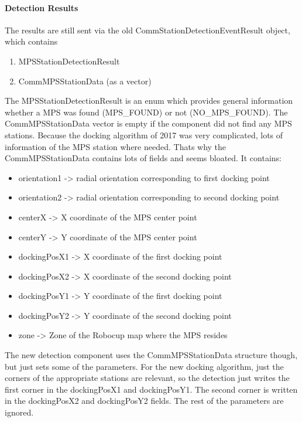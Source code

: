\paragraph{Detection Results}
The results are still sent via the old CommStationDetectionEventResult object, which contains 

\begin{enumerate}
\item MPSStationDetectionResult
\item CommMPSStationData (as a vector)
\end{enumerate}

The MPSStationDetectionResult is an enum which provides general information whether a MPS was found (MPS\_FOUND) or not (NO\_MPS\_FOUND).
The CommMPSStationData vector is empty if the component did not find any MPS stations. Because the docking algorithm of 2017 was very complicated, lots of information of the MPS station where needed. Thats why the CommMPSStationData contains lots of fields and seems bloated. It contains:

\begin{itemize}
\item orientation1 -> radial orientation corresponding to first docking point
\item orientation2 -> radial orientation corresponding to second docking point
\item centerX -> X coordinate of the MPS center point
\item centerY -> Y coordinate of the MPS center point
\item dockingPosX1 -> X coordinate of the first docking point
\item dockingPosX2 -> X coordinate of the second docking point
\item dockingPosY1 -> Y coordinate of the first docking point
\item dockingPosY2 -> Y coordinate of the second docking point
\item zone -> Zone of the Robocup map where the MPS resides
\end{itemize}

The new detection component uses the CommMPSStationData structure though, but just sets some of the parameters. For the new docking algorithm, just the corners of the appropriate stations are relevant, so the detection just writes the first corner in the dockingPosX1 and dockingPosY1. The second corner is written in the dockingPosX2 and dockingPosY2 fields. The rest of the parameters are ignored.

